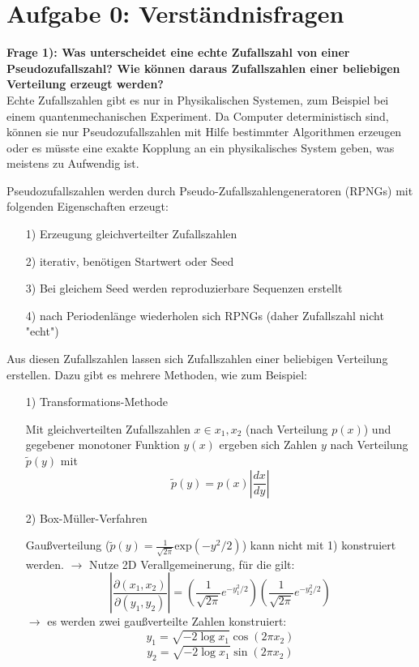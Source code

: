 \section*{Aufgabe 0: Verständnisfragen}

\textbf{Frage 1): Was unterscheidet eine echte Zufallszahl von einer Pseudozufallszahl? Wie können daraus
Zufallszahlen einer beliebigen Verteilung erzeugt werden?}\\
  Echte Zufallszahlen gibt es nur in Physikalischen Systemen, zum Beispiel bei einem
  quantenmechanischen Experiment. Da Computer deterministisch
  sind, können sie nur Pseudozufallszahlen mit Hilfe bestimmter Algorithmen erzeugen
  oder es müsste eine exakte Kopplung an ein physikalisches System geben, was meistens zu
  Aufwendig ist.

  Pseudozufallszahlen werden durch Pseudo-Zufallszahlengeneratoren (RPNGs)
  mit folgenden Eigenschaften erzeugt:
  \begin{itemize}
  \item[1)] Erzeugung gleichverteilter Zufallszahlen
  \item[2)] iterativ, benötigen Startwert oder Seed
  \item[3)] Bei gleichem Seed werden reproduzierbare Sequenzen erstellt
  \item[4)] nach Periodenlänge wiederholen sich RPNGs (daher Zufallszahl nicht "echt")
  \end{itemize}

  Aus diesen Zufallszahlen lassen sich Zufallszahlen einer beliebigen
  Verteilung erstellen. Dazu gibt es mehrere Methoden, wie zum Beispiel:
  \begin{itemize}
  \item[1)] Transformations-Methode

      Mit gleichverteilten Zufallszahlen $x \in{x_1,x_2}$ (nach Verteilung $p(x)$) und
      gegebener monotoner Funktion $y(x)$ ergeben sich Zahlen $y$ nach Verteilung
      $\tilde{p}(y)$ mit
      \begin{equation*}
        \tilde{p}(y) = p(x) |\frac{dx}{dy}|
      \end{equation*}

  \item[2)] Box-Müller-Verfahren

      Gaußverteilung ($\tilde{p}(y)=\frac{1}{\sqrt{2 \pi}} \text{exp}(-y^2/2)$) kann nicht mit 1) konstruiert werden.
      $\rightarrow$ Nutze 2D  Verallgemeinerung, für die gilt:
      \begin{equation*}
        \left| \frac{\partial(x_1,x_2)}{\partial(y_1,y_2)} \right| = \left(\frac{1}{\sqrt{2\pi}}e^{-y_1^2/2}\right)\left(\frac{1}{\sqrt{2\pi}}e^{-y_2^2/2}\right)
      \end{equation*}
      $\rightarrow$ es werden zwei gaußverteilte Zahlen konstruiert:
      \begin{equation*}
        y_1 = \sqrt{-2 \log{x_1}} \cos{(2 \pi x_2)}
      \end{equation*}
      \begin{equation*}
        y_2 = \sqrt{-2 \log{x_1} } \sin{(2 \pi x_2)}
      \end{equation*}
  \end{itemize}

